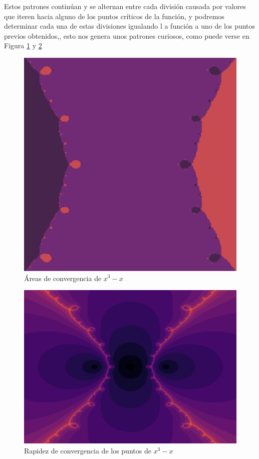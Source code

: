 Estos patrones continúan y se alternan entre cada división causada por valores que iteren hacia alguno de los puntos críticos de la función, y podremos determinar cada una de estas divisiones igualando l a función a uno de los puntos previos obtenidos,, esto nos genera unos patrones curiosos, como puede verse en Figura \ref{fig:eq_cubica_1} y \ref{fig:eq_cubica_2}
\begin{figure}[H]

        \centering
        \includegraphics{images/eq2-1.png}
        \caption{Áreas de convergencia de $x^3-x$}
        \label{fig:eq_cubica_1}
\end{figure}
    
\begin{figure}[H]
    \centering
    \includegraphics[scale=0.26]{images/eq2-2.png}
    \caption{Rapidez de convergencia de los puntos de $ x^3-x$}
    \label{fig:eq_cubica_2}
\end{figure}
